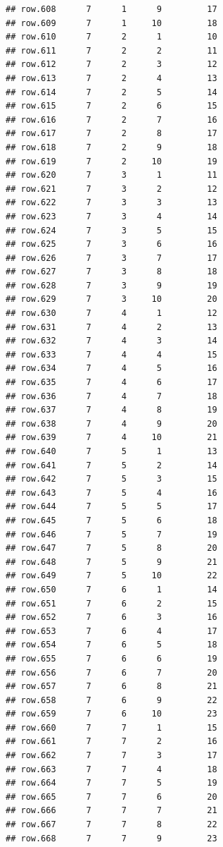 \documentclass[
]{article}
\begin{document}
\begin{verbatim}
## row.608      7      1      9         17
## row.609      7      1     10         18
## row.610      7      2      1         10
## row.611      7      2      2         11
## row.612      7      2      3         12
## row.613      7      2      4         13
## row.614      7      2      5         14
## row.615      7      2      6         15
## row.616      7      2      7         16
## row.617      7      2      8         17
## row.618      7      2      9         18
## row.619      7      2     10         19
## row.620      7      3      1         11
## row.621      7      3      2         12
## row.622      7      3      3         13
## row.623      7      3      4         14
## row.624      7      3      5         15
## row.625      7      3      6         16
## row.626      7      3      7         17
## row.627      7      3      8         18
## row.628      7      3      9         19
## row.629      7      3     10         20
## row.630      7      4      1         12
## row.631      7      4      2         13
## row.632      7      4      3         14
## row.633      7      4      4         15
## row.634      7      4      5         16
## row.635      7      4      6         17
## row.636      7      4      7         18
## row.637      7      4      8         19
## row.638      7      4      9         20
## row.639      7      4     10         21
## row.640      7      5      1         13
## row.641      7      5      2         14
## row.642      7      5      3         15
## row.643      7      5      4         16
## row.644      7      5      5         17
## row.645      7      5      6         18
## row.646      7      5      7         19
## row.647      7      5      8         20
## row.648      7      5      9         21
## row.649      7      5     10         22
## row.650      7      6      1         14
## row.651      7      6      2         15
## row.652      7      6      3         16
## row.653      7      6      4         17
## row.654      7      6      5         18
## row.655      7      6      6         19
## row.656      7      6      7         20
## row.657      7      6      8         21
## row.658      7      6      9         22
## row.659      7      6     10         23
## row.660      7      7      1         15
## row.661      7      7      2         16
## row.662      7      7      3         17
## row.663      7      7      4         18
## row.664      7      7      5         19
## row.665      7      7      6         20
## row.666      7      7      7         21
## row.667      7      7      8         22
## row.668      7      7      9         23

\end{verbatim}
\end{document}
